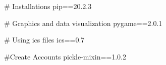# Installations
pip==20.2.3

# Graphics and data visualization
pygame==2.0.1

# Using ics files
ics==0.7

#Create Accounts 
pickle-mixin==1.0.2